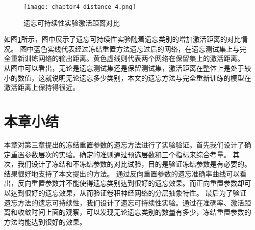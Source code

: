 \begin{figure}
    \centering
    \texttt{[image: chapter4\_distance\_4.png]}
    \caption{遗忘可持续性实验激活距离对比}
    \label{fig:chapter4_distance_4}
\end{figure}

如图\ref{fig:chapter4_distance_4}所示，图中展示了遗忘可持续性实验随着遗忘类别的增加激活距离的对比情况。
图中蓝色实线代表经过冻结重置方法遗忘过后的网络，在遗忘测试集上与完全重新训练网络的输出距离。黄色虚线则代表两个网络在保留集上的激活距离。
从图中可以看出，无论是遗忘测试集还是保留测试集，激活距离在整体上是处于较小的数值，这就说明无论遗忘多少类别，本文的遗忘方法与完全重新训练的模型在激活距离上保持得很近。

\section{本章小结}
本章对第三章提出的冻结重置参数的遗忘方法进行了实验验证。首先我们设计了确定重置参数层次的实验。确定的准则通过预选层数和三个指标来综合考量。
其次，我们设计了冻结和不冻结参数的对比试验，目的是验证冻结参数是有必要的。结果很好地支持了本文提出的方法。
通过反向重置参数的遗忘准确率曲线可以看出，反向重置参数并不能使得遗忘类别达到很好的遗忘效果。而正向重置参数却可以达到很好的遗忘效果，从而验证卷积神经网络的分层抽象特性。
最后为了验证遗忘方法的遗忘可持续性，我们设计了遗忘可持续性实验。通过在准确率、激活距离和收敛时间上面的观察，可以发现无论遗忘类别的数量有多少，冻结重置参数的方法均能达到很好的效果。


